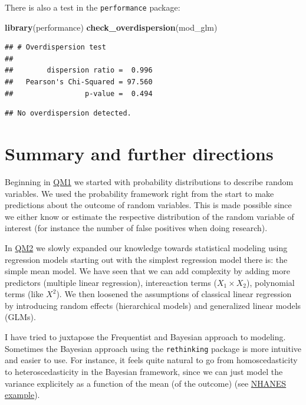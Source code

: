 \documentclass[
]{book}
\newenvironment{Shaded}{\begin{snugshade}}{\end{snugshade}}
\newcommand{\FunctionTok}[1]{\textcolor[rgb]{0.13,0.29,0.53}{\textbf{#1}}}
\newcommand{\NormalTok}[1]{#1}
\begin{document}
There is also a test in the \texttt{performance} package:

\begin{Shaded}
\begin{Highlighting}[]
\FunctionTok{library}\NormalTok{(performance)}
\FunctionTok{check\_overdispersion}\NormalTok{(mod\_glm)}
\end{Highlighting}
\end{Shaded}

\begin{verbatim}
## # Overdispersion test
## 
##        dispersion ratio =  0.996
##   Pearson's Chi-Squared = 97.560
##                 p-value =  0.494
\end{verbatim}

\begin{verbatim}
## No overdispersion detected.
\end{verbatim}

\section{Summary and further directions}\label{summary-and-further-directions}

Beginning in \href{https://jdegenfellner.github.io/Script_QM1_ZHAW/}{QM1} we started
with probability distributions to describe random variables. We used the probability
framework right from the start to make predictions about the outcome of
random variables. This is made possible since we either know or estimate
the respective distribution of the random variable of interest (for instance the number of false positives
when doing research).

In \href{https://jdegenfellner.github.io/Script_QM2_ZHAW/index.html}{QM2} we slowly expanded
our knowledge towards statistical modeling using regression models starting out with the
simplest regression model there is: the simple mean model.
We have seen that we can add complexity by adding more predictors (multiple linear regression),
intereaction terms (\(X_1 \times X_2\)), polynomial terms (like \(X^2\)).
We then loosened the assumptions of classical linear regression by introducing
random effects (hierarchical models) and generalized linear models (GLMs).

I have tried to juxtapose the Frequentist and Bayesian approach to modeling.
Sometimes the Bayesian approach using the \texttt{rethinking} package is more intuitive and easier to use.
For instance, it feels quite natural to go from homoscedasticity to heteroscedasticity
in the Bayesian framework, since we can just model the variance explicitely as a function of the mean (of the outcome)
(see \href{https://jdegenfellner.github.io/Script_QM2_ZHAW/multiple-linear-regression.html\#example_nhanes}{NHANES example}).
\end{document}
